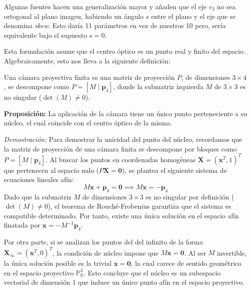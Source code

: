 \documentclass[
10pt, %
a4paper, %
oneside, %
headinclude,footinclude, %
BCOR=5mm, %
]{scrartcl}
\begin{document}
Algunas fuentes hacen una generalización mayor y añaden que el eje $v_3$ no sea ortogonal al plano imagen, habiendo un ángulo $s$ entre el plano y el eje que se denomina \textit{skew}. Esto daría 11 parámetros en vez de nuestros 10 pero, sería equivalente bajo el supuesto $s=0$.

Esta formulación asume que el centro óptico es un punto real y finito del espacio. Algebraicamente, esto nos lleva a la siguiente definición:

\begin{definition}
    Una cámara proyectiva finita es una matriz de proyección $P$, de dimensiones $3 \times 4$, se descompone como $P = [M \mid \mathbf{p}_4]$, donde la submatriz izquierda $M$ de $3 \times 3$ es no singular ($\det(M) \neq 0$).
\end{definition}

\textbf{Proposición:} La aplicación de la cámara tiene un único punto perteneciente a su núcleo, el cual coincide con el centro óptico de la misma.

\textit{Demostración:} Para demostrar la unicidad del punto del núcleo, recordamos que la matriz de proyección de una cámara finita se descompone por bloques como $P = [M \mid \mathbf{p}_4]$. Al buscar los puntos en coordenadas homogéneas $\mathbf{X} = (\mathbf{x}^T, 1)^T$ que pertenecen al espacio nulo ($P\mathbf{X} = \mathbf{0}$), se plantea el siguiente sistema de ecuaciones lineales afín:
\[
    M\mathbf{x} + \mathbf{p}_4 = \mathbf{0} \implies M\mathbf{x} = -\mathbf{p}_4
\]
Dado que la submatriz $M$ de dimensiones $3 \times 3$ es no singular por definición ($\det(M) \neq 0$), el teorema de Rouché-Frobenius garantiza que el sistema es compatible determinado. Por tanto, existe una única solución en el espacio afín finatada por $\mathbf{x} = -M^{-1}\mathbf{p}_4$. 

Por otra parte, si se analizan los puntos del del infinito de la forma $\mathbf{X}_\infty = (\mathbf{x}^T, 0)^T$, la condición de núcleo impone que $M\mathbf{x} = \mathbf{0}$. Al ser $M$ invertible, la única solución posible es la trivial $\mathbf{x} = \mathbf{0}$, la cual carece de sentido geométrico en el espacio proyectivo $\mathbb{P}^3_\mathbb{R}$. Esto concluye que el núcleo es un subespacio vectorial de dimensión 1 que induce un único punto afín en el espacio proyectivo.
\end{document}
